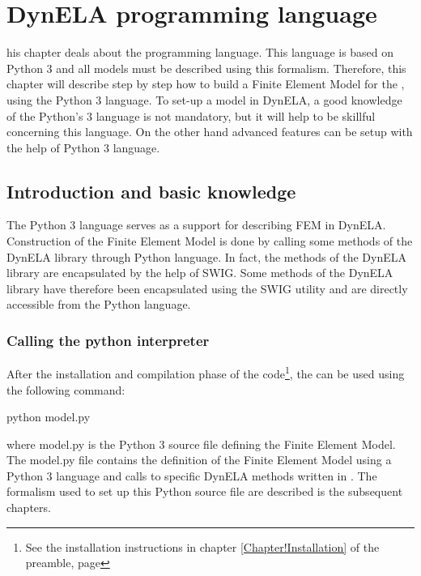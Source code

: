 %
%
%
\chapter{DynELA programming language}

\startcontents[chapters]
\printmyminitoc[2]his chapter deals about the \DynELA programming language. This language is based on Python 3 and all models must be described using this formalism. Therefore, this chapter will describe step by step how to build a Finite Element Model for the \DynELA, using the Python 3 language. To set-up a model in DynELA, a good knowledge of the Python's 3 language is not mandatory, but it will help to be skillful concerning this language. On the other hand advanced features can be setup with the help of Python 3 language.

\section{Introduction and basic knowledge}
The Python 3 language serves as a support for describing FEM in DynELA. Construction of the Finite Element Model is done by calling some \Cpp methods of the DynELA library through Python language. In fact, the \Cpp methods of the DynELA library are encapsulated by the help of SWIG. Some methods of the DynELA library have therefore been encapsulated using the SWIG utility and are directly accessible from the Python language.

\subsection{Calling the python interpreter}

After the installation and compilation phase of the code\footnote{See the installation instructions in chapter \ref{Chapter!Installation} of the preamble, page \pageref{Chapter!Installation}}, the \DynELA can be used using the following command:

\begin{BashListing}
python model.py
\end{BashListing}

where \textsf{model.py} is the Python 3 source file defining the Finite Element Model. The \textsf{model.py} file contains the definition of the Finite Element Model using a Python 3 language and calls to specific DynELA methods written in \Cpp. The formalism used to set up this Python source file are described is the subsequent chapters.

